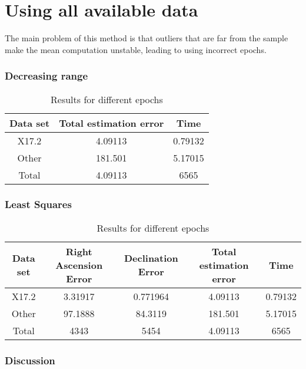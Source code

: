 \section{Using all available data}

The main problem of this method is that outliers that are far from the sample make the mean computation unstable, leading to using incorrect epochs.

\subsubsection{Decreasing range}

\begin{table}[h!]
	\centering
	\def\arraystretch{1.2}
	\begin{tabular}{|c c c|} 
		\hline
		Data set & Total estimation error & Time \\ [0.5ex] 
		\hline\hline
		X17.2  & 4.09113 & 0.79132 \\
		\hline
		Other & 181.501 & 5.17015 \\
		\hline\hline
		Total & 4.09113 & 6565 \\
		\hline
	\end{tabular}
	\caption{Results for different epochs}
\end{table}

\subsubsection{Least Squares}

\begin{table}[h!]
	\centering
	\def\arraystretch{1.2}
	\begin{tabular}{|c c c c c|} 
		\hline
		Data set & Right Ascension Error & Declination Error & Total estimation error & Time \\ [0.5ex] 
		\hline\hline
		X17.2 & 3.31917 & 0.771964 & 4.09113 & 0.79132 \\
		\hline
		Other & 97.1888 & 84.3119 & 181.501 & 5.17015 \\
		\hline\hline
		Total & 4343 & 5454 & 4.09113 & 6565 \\
		\hline
	\end{tabular}
	\caption{Results for different epochs}
\end{table}

\subsubsection{Discussion}

